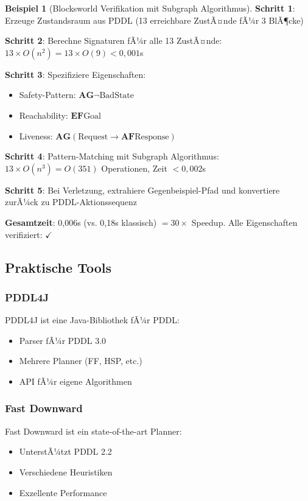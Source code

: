 ﻿\documentclass[a4paper,12pt]{article}
\theoremstyle{definition}
\newtheorem{beispiel}{Beispiel}[section]
\begin{document}
\begin{beispiel}[Blocksworld Verifikation mit Subgraph Algorithmus]
	\textbf{Schritt 1}: Erzeuge Zustandsraum aus PDDL (13 erreichbare ZustÃ¤nde fÃ¼r 3 BlÃ¶cke)

	\textbf{Schritt 2}: Berechne Signaturen fÃ¼r alle 13 ZustÃ¤nde: $13 \times O(n^2) = 13 \times O(9) < 0{,}001$s

	\textbf{Schritt 3}: Spezifiziere Eigenschaften:
	\begin{itemize}
		\item[-] Safety-Pattern: $\mathbf{AG}\neg\text{BadState}$
		\item[-] Reachability: $\mathbf{EF}\text{Goal}$
		\item[-] Liveness: $\mathbf{AG}(\text{Request} \to \mathbf{AF}\text{Response})$
	\end{itemize}

	\textbf{Schritt 4}: Pattern-Matching mit Subgraph Algorithmus: $13 \times O(n^3) = O(351)$ Operationen, Zeit $< 0{,}002$s

	\textbf{Schritt 5}: Bei Verletzung, extrahiere Gegenbeispiel-Pfad und konvertiere zurÃ¼ck zu PDDL-Aktionssequenz

	\textbf{Gesamtzeit}: 0{,}006s (vs. 0{,}18s klassisch) $= 30\times$ Speedup. Alle Eigenschaften verifiziert: $\checkmark$
\end{beispiel}

\subsection{Praktische Tools}

\subsubsection{PDDL4J}

PDDL4J ist eine Java-Bibliothek fÃ¼r PDDL:
\begin{itemize}
	\item[-] Parser fÃ¼r PDDL 3.0
	\item[-] Mehrere Planner (FF, HSP, etc.)
	\item[-] API fÃ¼r eigene Algorithmen
\end{itemize}

\subsubsection{Fast Downward}

Fast Downward ist ein state-of-the-art Planner:
\begin{itemize}
	\item[-] UnterstÃ¼tzt PDDL 2.2
	\item[-] Verschiedene Heuristiken
	\item[-] Exzellente Performance
\end{itemize}
\end{document}
